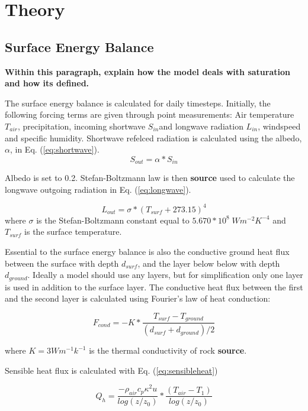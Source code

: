 \documentclass[a4paper,11pt,twocolumn]{article}
\begin{document}
\section{Theory}


\subsection{Surface Energy Balance}
\textbf{Within this paragraph, explain how the model deals with saturation and how its defined. }

The surface energy balance is calculated for daily timesteps. Initially, the following forcing terms are given through point  measurements: Air temperature $T_{air}$, precipitation, incoming shortwave $S_{in} $and longwave radiation $L_{in}$, windspeed and specific humidity.
Shortwave refelced radiation is calculated using the albedo, $\alpha$, in Eq. (\ref{eq:shortwave}).
\begin{equation}
	S_{out} = \alpha * S_{in}
	\label{eq:shortwave}
\end{equation}

Albedo is set to 0.2. Stefan-Boltzmann law is then \textbf{source} used to calculate the longwave outgoing radiation in Eq. (\ref{eq:longwave}).

\begin{equation}
	L_{out} = \sigma * (T_{surf}+273.15)^4
	\label{eq:longwave}
\end{equation}
where $\sigma$ is the Stefan-Boltzmann constant equal to $5.670*10^8 \; Wm^{-2}K^{-4}$ and $T_{surf}$ is the surface temperature. 

Essential to the surface energy balance is also the conductive ground heat flux between the surface with depth $d_{surf}$, and the layer below below with depth $d_{ground}$. Ideally a model should use any layers, but for simplification only one layer is used in addition to the surface layer. The conductive heat flux between the first and the second layer is calculated using Fourier's law of heat conduction:

\begin{equation}
F_{cond} = 
-K*\frac{T_{surf}-T_{ground}}{(d_{surf}+d_{ground})/2}
\end{equation}

where $K = 3 Wm^{-1}k^{-1}$ is the thermal conductivity of rock \textbf{source}. 

Sensible heat flux is calculated with Eq. (\ref{eq:sensibleheat})

\begin{equation}
Q_h = \frac{-\rho_{air}c_p\kappa^2u}{log(z/z_0)}* \frac{(T_{air}-T_1)}{log(z/z_0)}
\label{eq:sensibleheat}
\end{equation}
\end{document}
